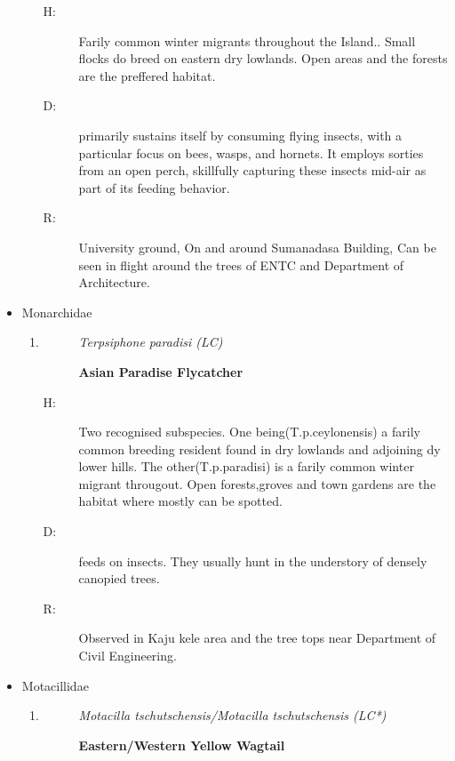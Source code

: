 \begin{itemize}
\begin{enumerate}
\begin{description}
\end{description}%
\begin{description}%
\item[H: ]%
Farily common winter migrants throughout the Island.. Small flocks do breed on eastern dry lowlands. Open areas and the forests are the preffered habitat.%
\item[D: ]%
primarily sustains itself by consuming flying insects, with a particular focus on bees, wasps, and hornets. It employs sorties from an open perch, skillfully capturing these insects mid{-}air as part of its feeding behavior.%
\item[R: ]%
University ground, On and around Sumanadasa Building, Can be seen in flight around the trees of  ENTC and Department of Architecture.%
\end{description}%
\end{enumerate}%
\item%
Monarchidae%
\begin{enumerate}%
\item%
\begin{description}%
\item[]%
\textit{Terpsiphone paradisi (LC)}%
\item[]%
\textbf{Asian Paradise Flycatcher}%
\end{description}%
\begin{description}%
\item[H: ]%
Two recognised subspecies. One being(T.p.ceylonensis) a farily common breeding resident found in dry lowlands and adjoining dy lower hills. The other(T.p.paradisi) is a farily common winter migrant througout. Open forests,groves and town gardens are the habitat where mostly can be spotted.%
\item[D: ]%
feeds on insects.  They usually hunt in the understory of densely canopied trees.%
\item[R: ]%
Observed in Kaju kele area and the tree tops near Department of Civil Engineering.%
\end{description}%
\end{enumerate}%
\item%
Motacillidae%
\begin{enumerate}%
\item%
\begin{description}%
\item[]%
\textit{Motacilla tschutschensis/Motacilla tschutschensis (LC*)}%
\item[]%
\textbf{Eastern/Western Yellow Wagtail}%
\end{description}%

\end{enumerate}
\end{itemize}
